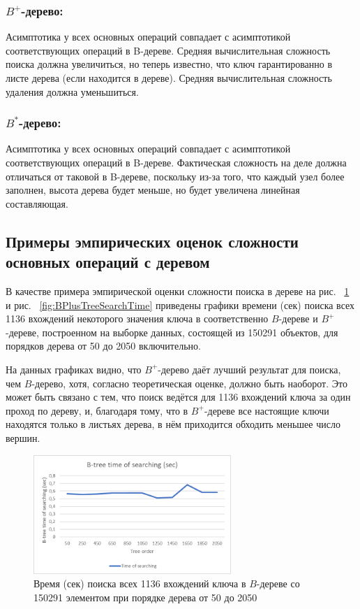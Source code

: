 \documentclass{llncs}
\begin{document}
    \subsubsection{$B^+$-дерево:}
    
    Асимптотика у всех основных операций совпадает с асимптотикой соответствующих операций в B-дереве. Средняя вычислительная сложность поиска должна увеличиться, но теперь известно, что ключ гарантированно в листе дерева (если находится в дереве). Средняя вычислительная сложность удаления должна уменьшиться.
    
    \subsubsection{$B^*$-дерево:}
    
    Асимптотика у всех основных операций совпадает с асимптотикой соответствующих операций в B-дереве. Фактическая сложность на деле должна отличаться от таковой в B-дереве, поскольку из-за того, что каждый узел более заполнен, высота дерева будет меньше, но будет увеличена линейная составляющая.
	
	\subsection{Примеры эмпирических оценок сложности основных операций с деревом}
	
	В качестве примера эмпирической оценки сложности поиска в дереве на рис. ~\ref{fig:BTreeSearchTime} и рис. ~\ref{fig:BPlusTreeSearchTime} приведены графики времени (сек) поиска всех 1136 вхождений некоторого значения ключа в соответственно $B$-дереве и $B^+$-дереве, построенном на выборке данных, состоящей из 150291 объектов, для порядков дерева от 50 до 2050 включительно.
	
	На данных графиках видно, что $B^+$-дерево даёт лучший результат для поиска, чем $B$-дерево, хотя, согласно теоретическая оценке, должно быть наоборот. Это может быть связано с тем, что поиск ведётся для 1136 вхождений ключа за один проход по дереву, и, благодаря тому, что в $B^+$-дереве все настоящие ключи находятся только в листьях дерева, в нём приходится обходить меньшее число вершин.
	
	\begin{figure}[h!]
		\centering
		\includegraphics[width=7.5cm]{BTreeSearchTime}
		\caption{Время (сек) поиска всех 1136 вхождений ключа в $B$-дереве со 150291 элементом при порядке дерева от 50 до 2050}
		\label{fig:BTreeSearchTime}
	\end{figure}
    
\end{document}
